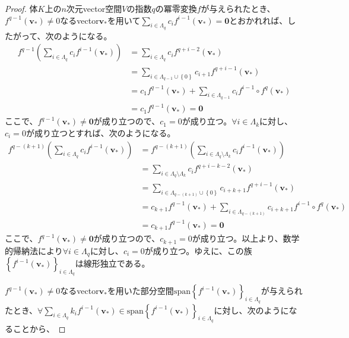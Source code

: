 \documentclass[dvipdfmx]{jsarticle}
\begin{document}
\begin{proof}
体$K$上の$n$次元vector空間$V$の指数$q$の冪零変換$f$が与えられたとき、$f^{q - 1}\left( \mathbf{v}_{*} \right) \neq 0$なるvector$\mathbf{v}_{*}$を用いて$\sum_{i \in \varLambda_{q}} {c_{i}f^{i - 1}\left( \mathbf{v}_{*} \right)} = \mathbf{0}$とおかれれば、したがって、次のようになる。
\begin{align*}
f^{q - 1}\left( \sum_{i \in \varLambda_{q}} {c_{i}f^{i - 1}\left( \mathbf{v}_{*} \right)} \right) &= \sum_{i \in \varLambda_{q}} {c_{i}f^{q + i - 2}\left( \mathbf{v}_{*} \right)}\\
&= \sum_{i \in \varLambda_{q - 1} \cup \left\{ 0 \right\}} {c_{i + 1}f^{q + i - 1}\left( \mathbf{v}_{*} \right)}\\
&= c_{1}f^{q - 1}\left( \mathbf{v}_{*} \right) + \sum_{i \in \varLambda_{q - 1}} {c_{i}f^{i - 1} \circ f^{q}\left( \mathbf{v}_{*} \right)}\\
&= c_{1}f^{q - 1}\left( \mathbf{v}_{*} \right) = \mathbf{0}
\end{align*}
ここで、$f^{q - 1}\left( \mathbf{v}_{*} \right) \neq \mathbf{0}$が成り立つので、$c_{1} = 0$が成り立つ。$\forall i \in \varLambda_{k}$に対し、$c_{i} = 0$が成り立つとすれば、次のようになる。
\begin{align*}
f^{q - (k + 1)}\left( \sum_{i \in \varLambda_{q}} {c_{i}f^{i - 1}\left( \mathbf{v}_{*} \right)} \right) &= f^{q - (k + 1)}\left( \sum_{i \in \varLambda_{q} \setminus \varLambda_{k}} {c_{i}f^{i - 1}\left( \mathbf{v}_{*} \right)} \right)\\
&= \sum_{i \in \varLambda_{q} \setminus \varLambda_{k}} {c_{i}f^{q + i - k - 2}\left( \mathbf{v}_{*} \right)}\\
&= \sum_{i \in \varLambda_{q - (k + 1)} \cup \left\{ 0 \right\}} {c_{i + k + 1}f^{q + i - 1}\left( \mathbf{v}_{*} \right)}\\
&= c_{k + 1}f^{q - 1}\left( \mathbf{v}_{*} \right) + \sum_{i \in \varLambda_{q - (k + 1)}} {c_{i + k + 1}f^{i - 1} \circ f^{q}\left( \mathbf{v}_{*} \right)}\\
&= c_{k + 1}f^{q - 1}\left( \mathbf{v}_{*} \right) = \mathbf{0}
\end{align*}
ここで、$f^{q - 1}\left( \mathbf{v}_{*} \right) \neq \mathbf{0}$が成り立つので、$c_{k + 1} = 0$が成り立つ。以上より、数学的帰納法により$\forall i \in \varLambda_{q}$に対し、$c_{i} = 0$が成り立つ。ゆえに、この族$\left\{ f^{i-1} \left( \mathbf{v}_{*} \right) \right\}_{i \in \varLambda_{q} }$は線形独立である。\par
$f^{q - 1}\left( \mathbf{v}_{*} \right) \neq 0$なるvector$\mathbf{v}_{*}$を用いた部分空間${\mathrm{span}}\left\{ f^{i - 1}\left( \mathbf{v}_{*} \right) \right\}_{i \in \varLambda_{q}}$が与えられたとき、$\forall\sum_{i \in \varLambda_{q}} {k_{i}f^{i - 1}\left( \mathbf{v}_{*} \right)} \in {\mathrm{span}}\left\{ f^{i - 1}\left( \mathbf{v}_{*} \right) \right\}_{i \in \varLambda_{q}}$に対し、次のようになることから、

\end{proof}
\end{document}
